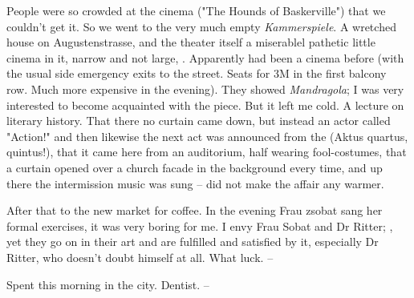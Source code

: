 
People were so crowded at the cinema ("The Hounds of Baskerville") that we couldn't get it. So we went to the very much empty \textit{Kammerspiele}. A wretched house on Augustenstrasse, and the theater itself a miserablel pathetic little cinema in it, narrow and not large, . Apparently had been a cinema before (with the usual side emergency exits to the street. Seats for 3M in the first balcony row. Much more expensive in the evening). They showed \textit{Mandragola}; I was very interested to become acquainted with the piece. But it left me cold. A lecture on literary history. That there no curtain came down, but instead an actor called "Action!" and then likewise the next act was announced from the  (Aktus quartus, quintus!), that it came here from an auditorium, half wearing fool-costumes, that a curtain opened over a church facade in the background every time, and up there the intermission music was sung -- did not make the affair any warmer. \missing

After that to the new market for coffee. In the evening Frau zsobat sang her formal exercises, it was very boring for me. I envy Frau Sobat and Dr Ritter; , yet they go on in their art and are fulfilled and satisfied by it, especially Dr Ritter, who doesn't doubt himself at all. What luck. --

Spent this morning in the city. Dentist. --